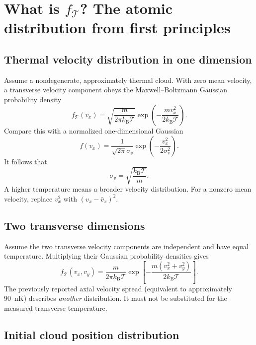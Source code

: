 \documentclass[11pt,a4paper]{article}
\numberwithin{equation}{section}
\newcommand{\Tat}{\mathcal{T}}
\newcommand{\kb}{k_{\mathrm B}}
\begin{document}
\section{What is $f_{\Tat}$? The atomic distribution from first principles}

\subsection{Thermal velocity distribution in one dimension}

Assume a nondegenerate, approximately thermal cloud. With zero mean velocity,
a transverse velocity component obeys the Maxwell--Boltzmann Gaussian
probability density
\begin{equation}\label{eq:fv1d}
\boxed{f_{\Tat}(v_x)=\sqrt{\frac{m}{2\pi\kb\Tat}}
\exp\left(-\frac{m v_x^2}{2\kb\Tat}\right).}
\end{equation}
Compare this with a normalized one-dimensional Gaussian
\begin{equation}
 f(v_x)=\frac{1}{\sqrt{2\pi}\sigma_v}
 \exp\left(-\frac{v_x^2}{2\sigma_v^2}\right).
\end{equation}
It follows that
\begin{equation}\label{eq:sv}
\boxed{\sigma_v=\sqrt{\frac{\kb\Tat}{m}}.}
\end{equation}
A higher temperature means a broader velocity distribution. For a nonzero
mean velocity, replace $v_x^2$ with $(v_x-\bar v_x)^2$.

\subsection{Two transverse dimensions}

Assume the two transverse velocity components are independent and have equal
temperature. Multiplying their Gaussian probability densities gives
\begin{equation}\label{eq:fv2d}
\boxed{f_{\Tat}(v_x,v_y)=\frac{m}{2\pi\kb\Tat}
\exp\left[-\frac{m(v_x^2+v_y^2)}{2\kb\Tat}\right].}
\end{equation}
The previously reported axial velocity spread (equivalent to approximately
\SI{90}{nK}) describes \emph{another} distribution. It must not be substituted
for the measured transverse temperature.

\subsection{Initial cloud position distribution}
\end{document}
